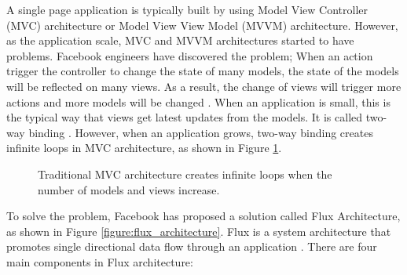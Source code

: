 A single page application is typically built by using Model View Controller (MVC) architecture or Model View View Model (MVVM) architecture. However, as the application scale, MVC and MVVM architectures started to have problems. Facebook engineers have discovered the problem; When an action trigger the controller to change the state of many models, the state of the models will be reflected on many views. As a result, the change of views will trigger more actions and more models will be changed \cite[]{jingchen2014}. When an application is small, this is the typical way that views get latest updates from the models. It is called two-way binding \cite[]{heinrich2011websoda}. However, when an application grows, two-way binding creates infinite loops in MVC architecture, as shown in Figure \ref{figure:mvc_problems}. 

\begin{figure}[t]
\centering
{}
\caption{Traditional MVC architecture creates infinite loops when the number of models and views increase.}
\label{figure:mvc_problems}
\end{figure}

To solve the problem, Facebook has proposed a solution called Flux Architecture, as shown in Figure \ref{figure:flux_architecture}. Flux is a system architecture that promotes single directional data flow through an application \cite[]{billfisherjingchen2014}. There are four main components in Flux architecture:


